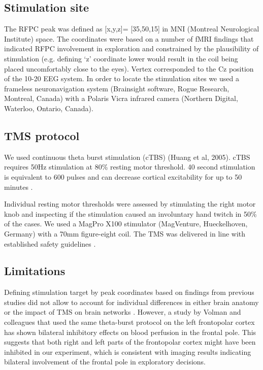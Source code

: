 \documentclass[12pt]{article}
\begin{document}
\subsection*{Stimulation site}

The RFPC peak was defined as [x,y,z]= [35,50,15] in MNI (Montreal Neurological Institute) space. The coordinates were based on a number of fMRI findings that indicated RFPC involvement in exploration \cite{Badre2012-nt,Boorman2009-ns,Daw2006-vw} and constrained by the plausibility of stimulation (e.g. defining `z' coordinate lower would result in the coil being placed uncomfortably close to the eyes). Vertex corresponded to the Cz position of the 10-20 EEG system. In order to locate the stimulation sites we used a frameless neuronavigation system (Brainsight software, Rogue Research, Montreal, Canada) with a Polaris Vicra infrared camera (Northern Digital, Waterloo, Ontario, Canada).

\subsection*{TMS protocol}

We used continuous theta burst stimulation (cTBS) (Huang et al, 2005). cTBS requires 50Hz stimulation at 80\% resting motor threshold. 40 second stimulation is equivalent to 600 pulses and can decrease cortical excitability for up to 50 minutes \cite{Wischnewski2015-rd}.

Individual resting motor thresholds were assessed by stimulating the right motor knob and inspecting if the stimulation caused an involuntary hand twitch in 50\% of the cases.  We used a MagPro X100 stimulator (MagVenture, Hueckelhoven, Germany) with a 70mm figure-eight coil. The TMS was delivered in line with established safety guidelines \cite{Rossi2009-sf}.

\subsection*{Limitations}

Defining stimulation target by peak coordinates based on findings from previous studies did not allow to account for individual differences in either brain anatomy or the impact of TMS on brain networks \cite{Gratton2013-wz}. However, a study by Volman and colleagues \cite{Volman2011-fz} that used the same theta-burst protocol on the left frontopolar cortex has shown bilateral inhibitory effects on blood perfusion in the frontal pole. This suggests that both right and left parts of the frontopolar cortex might have been inhibited in our experiment, which is consistent with imaging results indicating bilateral involvement of the frontal pole in exploratory decisions.
\end{document}
